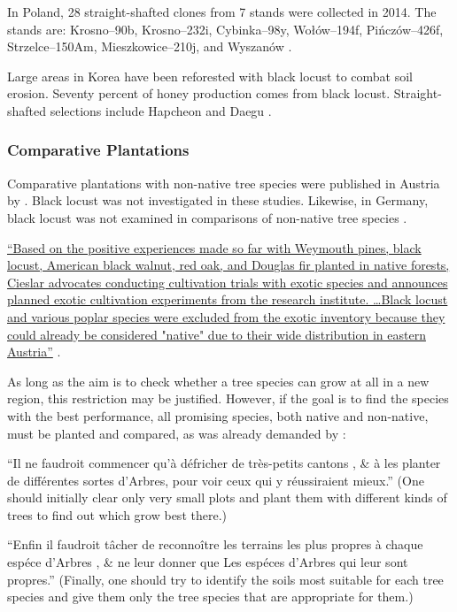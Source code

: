 In Poland, 28 straight-shafted clones from 7 stands were collected in 2014.
The stands are: Krosno--90b, Krosno--232i, Cybinka--98y, Wołów--194f,
Pińczów--426f, Strzelce--150Am, Mieszkowice--210j, and Wyszanów
\citep{wojda2015robiniePolen}.

Large areas in Korea have been reforested with black locust to combat soil erosion.
Seventy percent of honey production comes from black locust. Straight-shafted
selections include Hapcheon and Daegu \citep{lee2007robinieKorea}.

\subsubsection{Comparative Plantations}

Comparative plantations with non-native tree species were published in Austria by \citet{cieslar1901fremdlaendischeHolzarten}. Black locust was not investigated in these studies. Likewise, in Germany, black locust was not examined in comparisons of non-native tree species \citep{schwappach1901fremdlaendischeHolzarten}.

\hyperlink{german:rannert1979fremdlaendischeBaumarten}{\enquote{Based on the positive experiences made so far with Weymouth pines, black locust, American black walnut, red oak, and Douglas fir planted in native forests, Cieslar advocates conducting cultivation trials with exotic species and announces planned exotic cultivation experiments from the research institute. \dots Black locust and various poplar species were excluded from the exotic inventory because they could already be considered "native" due to their wide distribution in eastern Austria}}
\citep[own translation]{rannert1979fremdlaendischeBaumarten}.

As long as the aim is to check whether a tree species can grow at all in a new region, this restriction may be justified.
However, if the goal is to find the species with the best performance, all promising species, both native and non-native, must be planted and compared, as was already demanded by \citet[p.~300]{reaumur1721ertragstafel}:

\enquote{Il ne faudroit commencer qu’à défricher de très-petits cantons , \& à les planter de différentes sortes d'Arbres, pour voir ceux qui y réussiraient mieux.} (One should initially clear only very small plots and plant them with different kinds of trees to find out which grow best there.)

\enquote{Enfin il faudroit tâcher de reconnoître les terrains les plus  propres à chaque espéce d’Arbres , \& ne leur donner que Les espéces d’Arbres qui leur sont propres.} (Finally, one should try to identify the soils most suitable for each tree species and give them only the tree species that are appropriate for them.)

